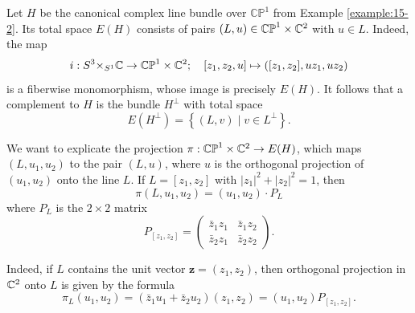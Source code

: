 \begin{example}\label{example:17-9}
  Let $H$ be the canonical complex line bundle over ${\mathbb{{CP}}}^1$ from Example \ref{example:15-2}. 
  Its total space $E(H)$ consists of pairs $({L,u})  \in  {\mathbb{{CP}}}^1 \times  {{\ensuremath{\mathbb{C}}}}^{2}$ with $u \in  L$. 
  Indeed, the map
  \[
    i:{S}^{3}{ \times  }_{{S}^1}{\mathbb{C}} \rightarrow  {\mathbb{{CP}}}^1 \times  {{\ensuremath{\mathbb{C}}}}^{2};\quad
    [ {{z}_1,{z}_{2},u}] \mapsto  ( {[  {{z}_1,{z}_{2}}] ,u{z}_1,u{z}_{2}})
  \]
  is a fiberwise monomorphism, whose image is precisely $E( H)$. It follows that a 
  complement to $H$ is the bundle ${H}^{ \bot  }$ with total space
  \[
    E( {H}^{ \bot  })  = \left\{  {( {L,v})  \mid  v \in  {L}^{ \bot  }}\right\} .
  \]

  We want to explicate the projection $\pi :{\mathbb{{CP}}}^1 \times  {{\ensuremath{\mathbb{C}}}}^{2} \rightarrow  E( H)$, 
  which maps $( {L,{u}_1,{u}_{2}})$ to the pair $(L, u)$, where $u$ is the orthogonal projection 
  of $( {{u}_1,{u}_{2}})$ onto the line $L$. If $L = [  {{z}_1,{z}_{2}}]$ 
  with ${\left| {z}_1\right| }^{2} + {\left| {z}_{2}\right| }^{2} = 1$, then
  \[
    \pi ( {L,{u}_1,{u}_{2}})  = ( {{u}_1,{u}_{2}})  \cdot  {P}_{L}
  \]
  where ${P}_{L}$ is the $2 \times 2$ matrix
  \[
    {P}_{[  {z}_1,{z}_{2}]  } =  
    \begin{pmatrix}
      {\bar{z}}_1{z}_1    & {\bar{z}}_1{z}_{2} \\  
      {\bar{z}}_{2}{z}_1  & {\bar{z}}_{2}{z}_{2}
    \end{pmatrix}.
  \]

  Indeed, if $L$ contains the unit vector $\mathbf{z} = ( {{z}_1,{z}_{2}})$, then orthogonal 
  projection in ${{\mathbb{C}}}^{2}$ onto $L$ is given by the formula
  \[
    {\pi }_{L}( {{u}_1,{u}_{2}})  
    = ( {{\bar{z}}_1{u}_1 + {\bar{z}}_{2}{u}_{2}}) ( {{z}_1,{z}_{2}})  
    = ( {{u}_1,{u}_{2}}) {P}_{[  {z}_1,{z}_{2}]  }.
  \]


\end{example}

